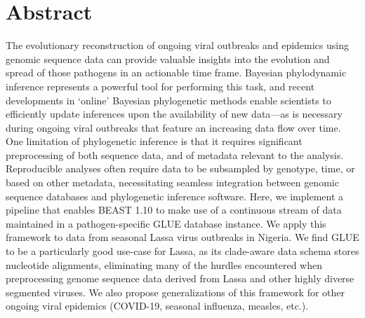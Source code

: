 \chapter{Abstract}                                 \label{ch:abstract}

The evolutionary reconstruction of ongoing viral outbreaks and epidemics using genomic sequence data can provide valuable insights into the evolution and spread of those pathogens in an actionable time frame.
Bayesian phylodynamic inference represents a powerful tool for performing this task, and recent developments in ‘online’ Bayesian phylogenetic methods enable scientists to efficiently update inferences upon the availability of new data—as is necessary during ongoing viral outbreaks that feature an increasing data flow over time.
One limitation of phylogenetic inference is that it requires significant preprocessing of both sequence data, and of metadata relevant to the analysis.
Reproducible analyses often require data to be subsampled by genotype, time, or based on other metadata, necessitating seamless integration between genomic sequence databases and phylogenetic inference software.
Here, we implement a pipeline that enables BEAST 1.10 to make use of a continuous stream of data maintained in a pathogen-specific GLUE database instance.
We apply this framework to data from seasonal Lassa virus outbreaks in Nigeria.
We find GLUE to be a particularly good use-case for Lassa, as its clade-aware data schema stores nucleotide alignments, eliminating many of the hurdles encountered when preprocessing genome sequence data derived from  Lassa and other highly diverse segmented viruses.
We also propose generalizations of this framework for other ongoing viral epidemics (COVID-19, seasonal influenza, measles, etc.).


\cleardoublepage

